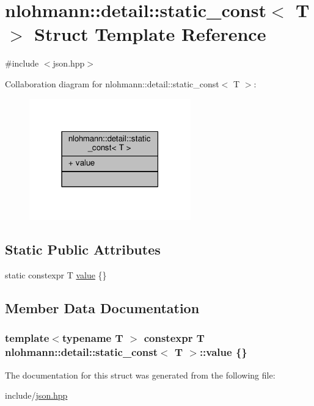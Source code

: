 \hypertarget{structnlohmann_1_1detail_1_1static__const}{}\section{nlohmann\+:\+:detail\+:\+:static\+\_\+const$<$ T $>$ Struct Template Reference}
\label{structnlohmann_1_1detail_1_1static__const}


{\ttfamily \#include $<$json.\+hpp$>$}



Collaboration diagram for nlohmann\+:\+:detail\+:\+:static\+\_\+const$<$ T $>$\+:
\nopagebreak
\begin{figure}[H]
\begin{center}
\leavevmode
\includegraphics[width=198pt]{structnlohmann_1_1detail_1_1static__const__coll__graph}
\end{center}
\end{figure}
\subsection*{Static Public Attributes}
\begin{DoxyCompactItemize}
\item 
static constexpr T \hyperlink{structnlohmann_1_1detail_1_1static__const_a6bb7ab2ddd6abc41fb4ffb7c6dfa237e}{value} \{\}
\end{DoxyCompactItemize}


\subsection{Member Data Documentation}
\subsubsection[{\texorpdfstring{value}{value}}]{\setlength{\rightskip}{0pt plus 5cm}template$<$typename T $>$ constexpr T {\bf nlohmann\+::detail\+::static\+\_\+const}$<$ T $>$\+::value \{\}\hspace{0.3cm}{\ttfamily [static]}}\hypertarget{structnlohmann_1_1detail_1_1static__const_a6bb7ab2ddd6abc41fb4ffb7c6dfa237e}{}\label{structnlohmann_1_1detail_1_1static__const_a6bb7ab2ddd6abc41fb4ffb7c6dfa237e}


The documentation for this struct was generated from the following file\+:\begin{DoxyCompactItemize}
\item 
include/\hyperlink{json_8hpp}{json.\+hpp}\end{DoxyCompactItemize}
